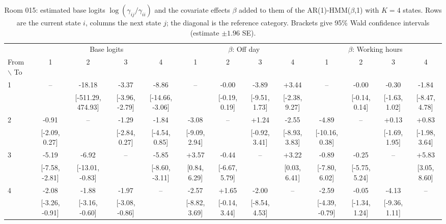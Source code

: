\begin{table}[ht]
\centering
\begin{adjustbox}{max width=\textwidth}
\begin{tabular}{lcccc|cccc|cccc}
\hline
 & \multicolumn{4}{c}{Base logits} & \multicolumn{4}{c}{$\beta$: Off day} & \multicolumn{4}{c}{$\beta$: Working hours} \\
\cmidrule(lr){2-5} \cmidrule(lr){6-9} \cmidrule(lr){10-13}
From $\backslash$ To & 1 & 2 & 3 & 4 & 1 & 2 & 3 & 4 & 1 & 2 & 3 & 4 \\
\hline
1 & -- & -18.18 & -3.37 & -8.86 & -- & -0.00 & -3.89 & +3.44 & -- & -0.00 & -0.30 & -1.84 \\
 &  & {\footnotesize [-511.29, 474.93]} & {\footnotesize [-3.96, -2.79]} & {\footnotesize [-14.66, -3.06]} &  & {\footnotesize [-0.19, 0.19]} & {\footnotesize [-9.51, 1.73]} & {\footnotesize [-2.38, 9.27]} &  & {\footnotesize [-0.14, 0.14]} & {\footnotesize [-1.63, 1.02]} & {\footnotesize [-8.47, 4.78]} \\
2 & -0.91 & -- & -1.29 & -1.84 & -3.08 & -- & +1.24 & -2.55 & -4.89 & -- & +0.13 & +0.83 \\
 & {\footnotesize [-2.09, 0.27]} &  & {\footnotesize [-2.84, 0.27]} & {\footnotesize [-4.54, 0.85]} & {\footnotesize [-9.09, 2.94]} &  & {\footnotesize [-0.92, 3.41]} & {\footnotesize [-8.93, 3.83]} & {\footnotesize [-10.16, 0.38]} &  & {\footnotesize [-1.69, 1.95]} & {\footnotesize [-1.98, 3.64]} \\
3 & -5.19 & -6.92 & -- & -5.85 & +3.57 & -0.44 & -- & +3.22 & -0.89 & -0.25 & -- & +5.83 \\
 & {\footnotesize [-7.58, -2.81]} & {\footnotesize [-13.01, -0.83]} &  & {\footnotesize [-8.60, -3.11]} & {\footnotesize [0.84, 6.29]} & {\footnotesize [-6.67, 5.79]} &  & {\footnotesize [0.03, 6.41]} & {\footnotesize [-7.80, 6.02]} & {\footnotesize [-5.75, 5.24]} &  & {\footnotesize [3.05, 8.60]} \\
4 & -2.08 & -1.88 & -1.97 & -- & -2.57 & +1.65 & -2.00 & -- & -2.59 & -0.05 & -4.13 & -- \\
 & {\footnotesize [-3.26, -0.91]} & {\footnotesize [-3.16, -0.60]} & {\footnotesize [-3.08, -0.86]} &  & {\footnotesize [-8.82, 3.69]} & {\footnotesize [-0.14, 3.44]} & {\footnotesize [-8.54, 4.53]} &  & {\footnotesize [-4.39, -0.79]} & {\footnotesize [-1.34, 1.24]} & {\footnotesize [-9.36, 1.11]} &  \\
\hline
\end{tabular}
\end{adjustbox}
\caption{Room 015: estimated base logits $\log(\gamma_{ij}/\gamma_{ii})$ and the covariate effects $\beta$ added to them of the AR(1)-HMM($\beta$,1) with $K=4$ states. Rows are the current state $i$, columns the next state $j$; the diagonal is the reference category. Brackets give 95\% Wald confidence intervals (estimate $\pm 1.96$ SE).}
\label{tab:params_working_transition_room_015_calibrated_anchor_random_search_ar1_hmm_beta_1_K4}
\end{table}
